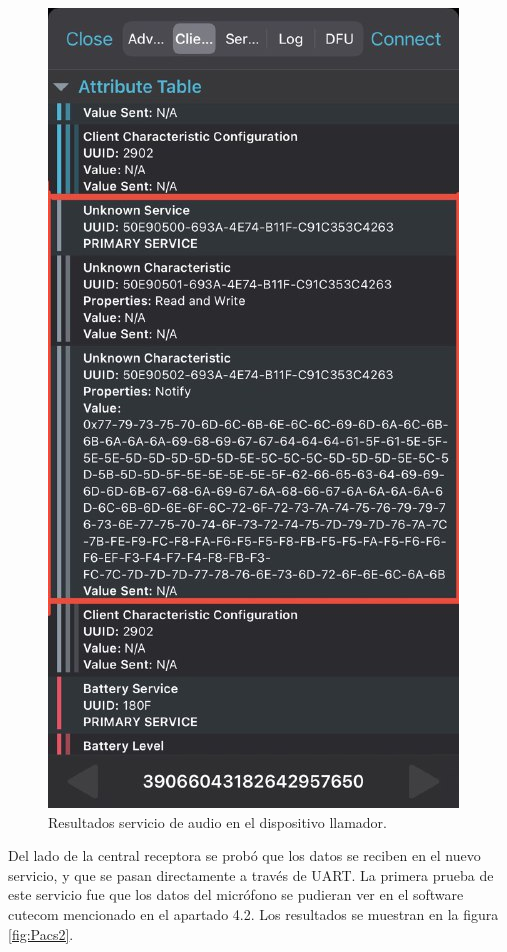 \begin{figure}[htpb]
	\centering
	\includegraphics[scale=0.5]{./Figures/acsCC.jpeg}	
	\caption{Resultados servicio de audio en el dispositivo llamador.}
	\label{fig:Pacs}
\end{figure}

Del lado de la central receptora se probó que los datos se reciben en el nuevo servicio, y que se pasan directamente a través de UART. La primera prueba de este servicio fue que los datos del micrófono se pudieran ver en el software cutecom mencionado en el apartado 4.2. Los resultados se muestran en la figura \ref{fig:Pacs2}.

